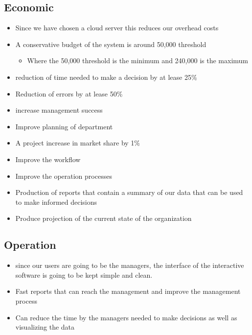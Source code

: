 \documentclass[12pt]{article}
\begin{document}
\subsection{Economic}
\begin{itemize}
    \item Since we have chosen a cloud server this reduces our overhead costs
    \item A conservative budget of the system is around 50,000 threshold
          \begin{itemize}
              \item Where the 50,000 threshold is the minimum and 240,000 is the maximum
          \end{itemize}
    \item reduction of time needed to make a decision by at lease 25\%
    \item Reduction of errors by at lease 50\%
    \item increase management success
    \item Improve planning of department
    \item A project increase in market share by 1\%
    \item Improve the workflow
    \item Improve the operation processes
    \item Production of reports that contain a summary of our data that can be used to make informed decisions
    \item Produce projection of the current state of the organization
\end{itemize}
\subsection{Operation}
\begin{itemize}
    \item since our users are going to be the managers, the interface of the interactive software is going to be kept simple and clean.
    \item Fast reports that can reach the management and improve the management process
    \item Can reduce the time by the managers needed to make decisions as well as visualizing the data
\end{itemize}
\end{document}
